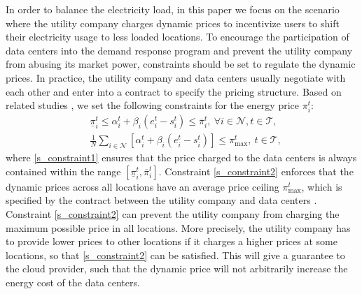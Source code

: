 \documentclass[journal]{IEEEtran}
\begin{document}
	In order to balance the electricity load, in this paper we focus on the scenario where the utility company charges dynamic prices to incentivize users to shift their electricity usage to less loaded locations. To encourage the participation of data centers into the demand response program and prevent the utility company from abusing its market power, constraints should be set to regulate the dynamic prices. In practice, the utility company and data centers usually negotiate with each other and enter into a contract \cite{contract} to specify the pricing structure. Based on related studies \cite{energyecon}, we set the following constraints for the energy price $\pi_i^t$:
	\begin{align}
		& \underline{\pi}_i^t \leq \alpha_{i}^{t} + \beta_{i} (e_{i}^{t}-s_i^t) \leq \overline{\pi}_i^t,~\forall i \in \mathcal{N}, t \in \mathcal{T},  \label{s_constraint1} \\
		& \frac{1}{N} \sum_{i \in \mathcal{N}} \left[ \alpha_{i}^{t} + \beta_{i} (e_{i}^{t}-s_i^t) \right] \leq \pi_{\max}^{t},~t \in \mathcal{T}, \label{s_constraint2}
	\end{align}
	where \eqref{s_constraint1} ensures that the price charged to the data centers is always contained within the range $[\underline{\pi}_i^t,\overline{\pi}_i^t]$. Constraint \eqref{s_constraint2} enforces that the dynamic prices across all locations have an average price ceiling $\pi_{\max}^{t}$, which is specified by the contract between the utility company and data centers \cite{energyecon}. Constraint \eqref{s_constraint2} can prevent the utility company from charging the maximum possible price in all locations. More precisely, the utility company has to provide lower prices to other locations if it charges a higher prices at some locations, so that \eqref{s_constraint2} can be satisfied. This will give a guarantee to the cloud provider, such that the dynamic price will not arbitrarily increase the energy cost of the data centers.
	
\end{document}
